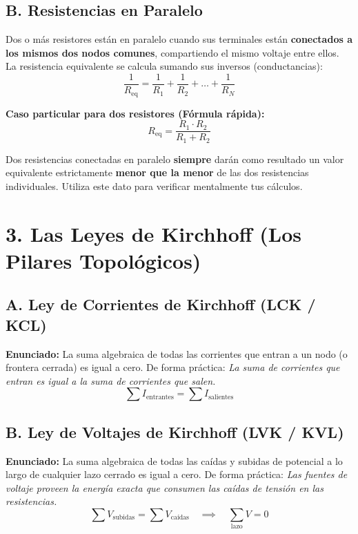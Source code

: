 \documentclass[11pt, a4paper]{article}
\begin{document}
\subsection*{B. Resistencias en Paralelo}
Dos o más resistores están en paralelo cuando sus terminales están \textbf{conectados a los mismos dos nodos comunes}, compartiendo el mismo voltaje entre ellos. La resistencia equivalente se calcula sumando sus inversos (conductancias):
\begin{equation}
    \frac{1}{R_{\text{eq}}} = \frac{1}{R_1} + \frac{1}{R_2} + \dots + \frac{1}{R_N}
\end{equation}

\noindent \textbf{Caso particular para dos resistores (Fórmula rápida):}
\begin{equation}
    R_{\text{eq}} = \frac{R_1 \cdot R_2}{R_1 + R_2}
\end{equation}

\begin{tcolorbox}[regla_oro, title=Regla de Oro]
Dos resistencias conectadas en paralelo \textbf{siempre} darán como resultado un valor equivalente estrictamente \textbf{menor que la menor} de las dos resistencias individuales. Utiliza este dato para verificar mentalmente tus cálculos.
\end{tcolorbox}

\section{3. Las Leyes de Kirchhoff (Los Pilares Topológicos)}

\subsection*{A. Ley de Corrientes de Kirchhoff (LCK / KCL)}
\textbf{Enunciado:} La suma algebraica de todas las corrientes que entran a un nodo (o frontera cerrada) es igual a cero. De forma práctica: \textit{La suma de corrientes que entran es igual a la suma de corrientes que salen.}
\begin{equation}
    \sum I_{\text{entrantes}} = \sum I_{\text{salientes}}
\end{equation}

\subsection*{B. Ley de Voltajes de Kirchhoff (LVK / KVL)}
\textbf{Enunciado:} La suma algebraica de todas las caídas y subidas de potencial a lo largo de cualquier lazo cerrado es igual a cero. De forma práctica: \textit{Las fuentes de voltaje proveen la energía exacta que consumen las caídas de tensión en las resistencias.}
\begin{equation}
    \sum V_{\text{subidas}} = \sum V_{\text{caídas}} \quad \implies \quad \sum_{\text{lazo}} V = 0
\end{equation}
\end{document}
